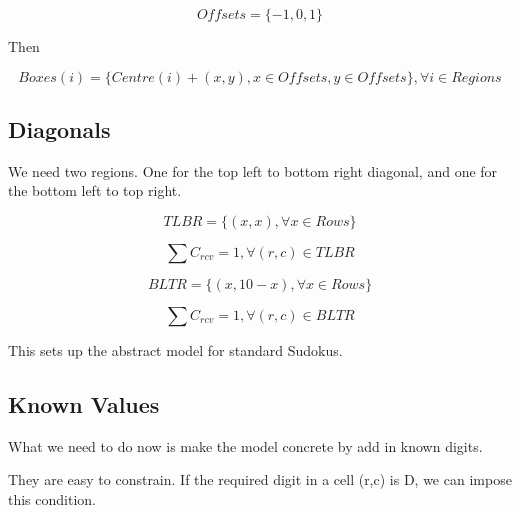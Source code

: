 \documentclass{article}
\begin{document}
\begin{equation}
Offsets = \lbrace -1,0,1 \rbrace
\end{equation}

Then

\begin{equation}
Boxes(i) = \lbrace Centre(i) + (x, y) , x \in Offsets, y \in Offsets \rbrace, \forall i \in Regions
\end{equation}


\subsection{Diagonals}

We need two regions. One for the top left to bottom right diagonal, and one for the bottom left to top right. 

\begin{equation}
TLBR = \lbrace (x, x), \forall x \in Rows \rbrace
\end{equation}

\begin{equation}
\sum C_{rcv} = 1, \forall (r,c) \in TLBR
\end{equation}

\begin{equation}
BLTR = \lbrace (x, 10-x), \forall x \in Rows \rbrace
\end{equation}

\begin{equation}
\sum C_{rcv} = 1, \forall (r,c) \in BLTR
\end{equation}



This sets up the abstract model for standard Sudokus. 


\subsection{Known Values}

What we need to do now is make the model concrete by add in known digits.

They are easy to constrain. If the required digit in a cell (r,c)  is D, we can impose this condition.
\end{document}
